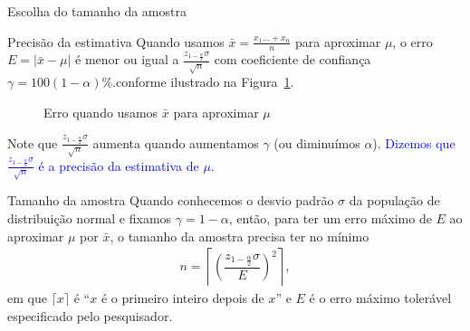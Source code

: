 \documentclass[8pt]{beamer}
\begin{document}
\begin{frame}{Escolha do tamanho da amostra}

\small

\begin{block}{Precisão da estimativa}
	Quando usamos $\bar{x} = \frac{x_1 \dots + x_n}{n}$ para aproximar $\mu$, o erro $E = \lvert \bar{x} - \mu \rvert$ é menor ou igual a $ \frac{z_{1-\frac{\alpha}{2}} \sigma}{\sqrt{n}}$ com coeficiente de confiança $\gamma = 100(1-\alpha)\%$.conforme  ilustrado na Figura~\ref{fig:intervalo_conf}.
	
	\begin{figure}
		\centering
		\caption{Erro quando usamos $\bar{x}$ para aproximar $\mu$}
		\label{fig:intervalo_conf}
	\end{figure}
	Note que $\frac{z_{1-\frac{\alpha}{2}} \sigma}{\sqrt{n}}$ aumenta quando aumentamos $\gamma$ (ou diminuímos $\alpha$).  \textcolor{blue}{Dizemos que $\frac{z_{1-\frac{\alpha}{2}} \sigma}{\sqrt{n}}$ é a precisão da estimativa de $\mu$.}
\end{block}

\begin{block}{Tamanho da amostra}
	Quando conhecemos o desvio padrão $\sigma$ da população de distribuição normal e fixamos $\gamma=1-\alpha$, então, para ter um erro máximo de $E$ ao aproximar $\mu$ por $\bar{x}$, o tamanho da amostra precisa ter no mínimo 
	\begin{align*}
		n = \left\lceil \left( \dfrac{z_{1-\frac{\alpha}{2}} \sigma }{E} \right)^2 \right\rceil,
	\end{align*}
	em que $\lceil x \rceil$ é ``$x$ é o primeiro inteiro depois de $x$'' e $E$ é o erro máximo tolerável especificado pelo pesquisador.
\end{block}

\normalsize

\end{frame}
\end{document}
